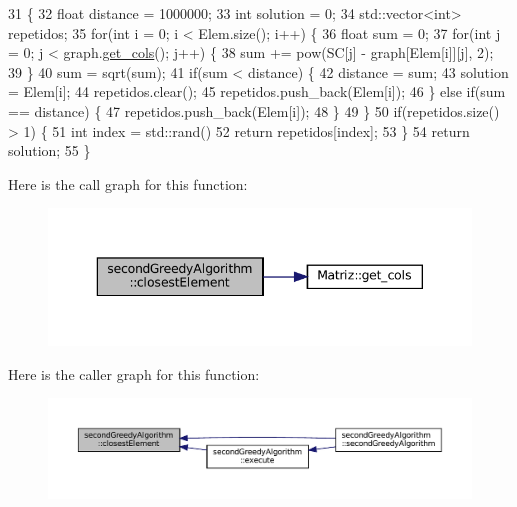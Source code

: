 \begin{DoxyCode}
31                                                                                   \{
32   \textcolor{keywordtype}{float} distance = 1000000;
33   \textcolor{keywordtype}{int} solution = 0;
34   std::vector<int> repetidos;
35   \textcolor{keywordflow}{for}(\textcolor{keywordtype}{int} i = 0; i < Elem.size(); i++) \{
36     \textcolor{keywordtype}{float} sum = 0;
37     \textcolor{keywordflow}{for}(\textcolor{keywordtype}{int} j = 0; j < graph.\hyperlink{classMatriz_ad6915f9b31f93230a3ce05d01d23a47b}{get\_cols}(); j++) \{
38       sum += pow(SC[j] - graph[Elem[i]][j], 2);
39     \}
40     sum = sqrt(sum);
41     \textcolor{keywordflow}{if}(sum < distance) \{
42       distance = sum;
43       solution = Elem[i];
44       repetidos.clear();
45       repetidos.push\_back(Elem[i]);
46     \} \textcolor{keywordflow}{else} \textcolor{keywordflow}{if}(sum == distance) \{
47       repetidos.push\_back(Elem[i]);
48     \}
49   \}
50   \textcolor{keywordflow}{if}(repetidos.size() > 1) \{
51     \textcolor{keywordtype}{int} index = std::rand() %
52     \textcolor{keywordflow}{return} repetidos[index];
53   \}
54   \textcolor{keywordflow}{return} solution;
55 \}
\end{DoxyCode}
Here is the call graph for this function\+:
\nopagebreak
\begin{figure}[H]
\begin{center}
\leavevmode
\includegraphics[width=343pt]{classsecondGreedyAlgorithm_ad34d30fcba1f3d71dc67ea6b12d5d0b8_cgraph}
\end{center}
\end{figure}
Here is the caller graph for this function\+:
\nopagebreak
\begin{figure}[H]
\begin{center}
\leavevmode
\includegraphics[width=350pt]{classsecondGreedyAlgorithm_ad34d30fcba1f3d71dc67ea6b12d5d0b8_icgraph}
\end{center}
\end{figure}
\mbox{\label{classsecondGreedyAlgorithm_a72574b0ef83083f7994af0eb4007cf39}} 
